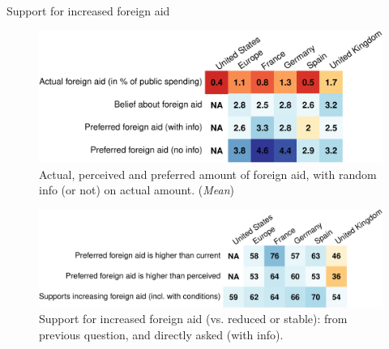 \begin{framefont}{\small}
\begin{frame}{Support for increased foreign aid\label{}}\vspace{-.2cm} 
    \begin{figure} 
        \centering 
        \caption{Actual, perceived and preferred amount of foreign aid, with random info (or not) on actual amount. (\textit{Mean})}\vspace{-.2cm}
        \includegraphics[height=.4\textheight]{../figures/country_comparison/foreign_aid_amount_mean.pdf} %
    \end{figure}\vspace{-.2cm}\pause
    \begin{figure} 
        \centering 
        \caption{Support for increased foreign aid (vs. reduced or stable): from previous question, and directly asked (with info).}\vspace{-.2cm}
        \includegraphics[height=.32\textheight]{../figures/country_comparison/foreign_aid_more_positive.pdf} 
    \end{figure} \vspace{-.1cm}
	\quad \quad \quad \quad \quad \quad {} \quad \quad \quad {}
\end{frame}


\end{framefont}
